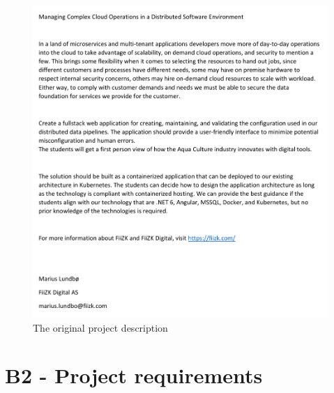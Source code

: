\begin{figure}[!ht]
    \begin{minipage}{1\textwidth}
      \centering
      \includegraphics[width=.95\textwidth]{Figures/appendix/project-description.pdf}
     \caption[Original project description]{The original project description}
     \label{requirements:description}
    \end{minipage}\hfill
\end{figure}

\newpage
\section*{\large{B2 - Project requirements}}
\vspace*{1cm}

